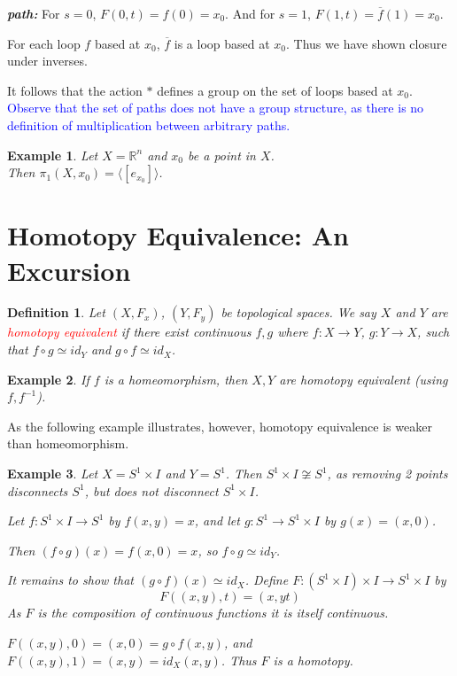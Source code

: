 \documentclass[12pt,letterpaper,boxed]{article}
\newtheorem*{example}{Example}
\newtheorem*{defn}{Definition}
\newcommand{\R}{\mathbb{R}}
\begin{document}
\emph{\bf path:} For $s=0$, $F(0,t)=f(0)=x_0$.  And for $s=1$, $F(1,t)=\overline{f}(1)=x_0$.

For each loop $f$ based at $x_0$, $\overline{f}$ is a loop based at $x_0$.  Thus we have shown closure under inverses.

\qedsymbol

It follows that the action $*$ defines a group on the set of loops based at $x_0$.
\textcolor{blue}{Observe that the set of paths does not have a group structure, as there is no definition of multiplication between arbitrary paths.}


\begin{example} Let $X=\R^n$ and $x_0$ be a point in $X$.\\  Then $\pi_1(X,x_0)=\langle [e_{x_0}]\rangle$.
\end{example}


\section{Homotopy Equivalence: An Excursion}
\begin{defn}  Let $(X,F_x)$, $(Y,F_y)$ be topological spaces.  We say $X$ and $Y$ are \emph{\textcolor{red}{homotopy equivalent}} if there exist continuous $f,g$ where $f:X\to Y$, $g:Y\to X$, such that $f\circ g\simeq id_Y$ and $g\circ f\simeq id_X$.
\end{defn}

\begin{example} If $f$ is a homeomorphism, then $X,Y$ are homotopy equivalent (using $f, f^{-1}$).
\end{example}

As the following example illustrates, however, homotopy equivalence is weaker than homeomorphism.

\begin{example} Let $X=S^1\times I$ and $Y=S^1$.  Then $S^1\times I\not\cong S^1$, as removing 2 points disconnects $S^1$, but does \emph{not} disconnect $S^1\times I$.

Let $f:S^1\times I\to S^1$ by $f(x,y)=x$, and let $g:S^1\to S^1\times I$ by $g(x)=(x,0)$.

Then $(f\circ g)(x)=f(x,0)=x$, so $f\circ g\simeq id_Y$.

It remains to show that $(g\circ f)(x)\simeq id_X$.  
Define $F:(S^1\times I)\times I\to S^1\times I$ by $$F((x,y),t)=(x,yt)$$
\normalsize
As $F$ is the composition of continuous functions it is itself continuous.

$F((x,y),0)=(x,0)=g\circ f(x,y)$, and $F((x,y),1)=(x,y)=id_X(x,y)$.  Thus $F$ is a homotopy.
\end{example}
\end{document}
